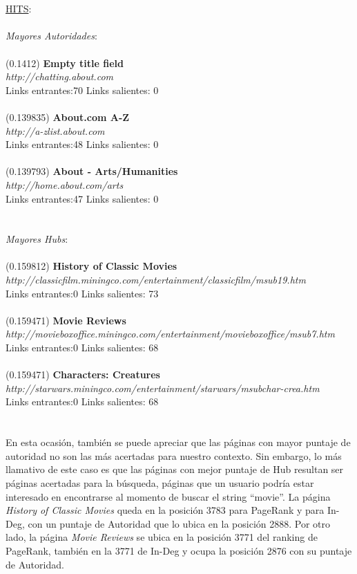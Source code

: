 \documentclass[a4paper]{article}
\begin{document}
\\
\\
\underline{HITS}: \\
\\
\emph{Mayores Autoridades}: \\
\\
(0.1412) \textbf{Empty title field} \\
\textit{http://chatting.about.com} \\
Links entrantes:70 \indent Links salientes: 0\\
\\
(0.139835)\textbf{ About.com A-Z} \\
\textit{http://a-zlist.about.com} \\
Links entrantes:48 \indent Links salientes: 0\\
\\
(0.139793) \textbf{About - Arts/Humanities} \\
\textit{http://home.about.com/arts} \\
Links entrantes:47 \indent Links salientes: 0\\
\\
\\
\emph{Mayores Hubs}: \\
\\
(0.159812) \textbf{History of Classic Movies} \\
\textit{http://classicfilm.miningco.com/entertainment/classicfilm/msub19.htm} \\
Links entrantes:0 \indent Links salientes: 73\\
\\
(0.159471)\textbf{ Movie Reviews} \\
\textit{http://movieboxoffice.miningco.com/entertainment/movieboxoffice/msub7.htm} \\
Links entrantes:0 \indent Links salientes: 68\\
\\
(0.159471) \textbf{Characters: Creatures} \\
\textit{http://starwars.miningco.com/entertainment/starwars/msubchar-crea.htm }\\
Links entrantes:0 \indent Links salientes: 68\\
\\
\\
\indent En esta ocasi\'on, tambi\'en se puede apreciar que las p\'aginas con mayor puntaje de autoridad no son las m\'as acertadas para nuestro contexto. Sin embargo, lo m\'as llamativo de este caso es que las p\'aginas con mejor puntaje de Hub resultan ser p\'aginas acertadas para la b\'usqueda, p\'aginas que un usuario podr\'ia estar interesado en encontrarse al momento de buscar el string ``movie''. La p\'agina \emph{History of Classic Movies} queda en la posici\'on 3783 para PageRank y para In-Deg, con un puntaje de Autoridad que lo ubica en la posici\'on 2888. Por otro lado, la p\'agina \emph{Movie Reviews} se ubica en la posici\'on 3771 del ranking de PageRank, tambi\'en en la 3771 de In-Deg y ocupa la posici\'on 2876 con su puntaje de Autoridad.\\
\end{document}
